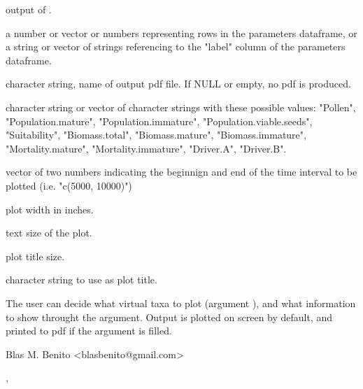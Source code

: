\documentclass[letterpaper]{book}
\begin{document}
%
\begin{Arguments}
\begin{ldescription}
\item[\code{simulation.output}] output of .

\item[\code{species}] a number or vector or numbers representing rows in the parameters dataframe, or a string or vector of strings referencing to the "label" column of the parameters dataframe.

\item[\code{filename}] character string, name of output pdf file. If NULL or empty, no pdf is produced.

\item[\code{columns}] character string or vector of character strings with these possible values: "Pollen", "Population.mature", "Population.immature", "Population.viable.seeds", "Suitability", "Biomass.total", "Biomass.mature", "Biomass.immature", "Mortality.mature", "Mortality.immature", "Driver.A", "Driver.B".

\item[\code{time.zoom}] vector of two numbers indicating the beginnign and end of the time interval to be plotted (i.e. "c(5000, 10000)")

\item[\code{width}] plot width in inches.

\item[\code{text.size}] text size of the plot.

\item[\code{title.size}] plot title size.

\item[\code{plot.title}] character string to use as plot title.
\end{ldescription}
\end{Arguments}
%
\begin{Details}\relax
The user can decide what virtual taxa to plot (argument ), and what information to show throught the  argument. Output is plotted on screen by default, and printed to pdf if the  argument is filled.
\end{Details}
%
\begin{Author}\relax
Blas M. Benito  <blasbenito@gmail.com>
\end{Author}
%
\begin{SeeAlso}\relax
{}, 
\end{SeeAlso}
\end{document}
